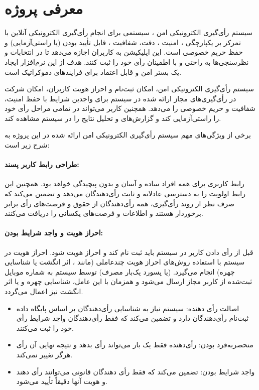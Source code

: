 \documentclass[12pt]{article}
\begin{document}
\section{معرفی پروژه} \label{sec:1}
سیستم رأی‌گیری الکترونیکی امن%
، 
سیستمی برای انجام رأی‌گیری الکترونیکی آنلاین با تمرکز بر یکپارچگی%
،
امنیت%
، 
دقت، شفافیت%
، 
قابل تأیید بودن%
(یا راستی‌آزمایی) و حفظ حریم خصوصی%
است. این اپلیکیشن به کاربران اجازه می‌دهد تا در انتخابات و نظرسنجی‌ها به راحتی و با اطمینان رأی خود را ثبت کنند. هدف از این نرم‌افزار ایجاد یک بستر امن و قابل اعتماد برای فرایندهای دموکراتیک است.


سیستم رأی‌گیری الکترونیکی امن، امکان ثبت‌نام و احراز هویت کاربران، امکان شرکت در رأی‌گیری‌های مجاز ارائه شده در سیستم برای واجدین شرایط با حفظ امنیت، شفافیت و حریم خصوصی را می‌دهد. همچنین کاربر می‌تواند در تمامی مراحل رأی خود را راستی‌آزمایی کند و گزارش‌های و تحلیل نتایج را در سیستم مشاهده کند. 


برخی از ویژگی‌های مهم سیستم رأی‌گیری الکترونیکی امن ارائه شده در این پروژه به شرح زیر است: 

\paragraph{طراحی رابط کاربر پسند:}
رابط کاربری برای همه افراد ساده و آسان و بدون پیچیدگی خواهد بود. همچنین این رابط اولویت را به دسترسی عادلانه و ثابت رأی‌دهندگان می‌دهد و تضمین می‌کند که صرف نظر از روند رأی‌گیری، همه رأی‌دهندگان از حقوق و فرصت‌های رأی برابر برخوردار هستند و اطلاعات و فرصت‌های یکسانی را دریافت می‌کنند.

\paragraph{احراز هویت و واجد شرایط بودن:}
قبل از رأی دادن کاربر در سیستم باید ثبت نام کند و احراز هویت%
شود. احراز هویت در سیستم با استفاده روش‌های احراز هویت چندعاملی%
(مانند 
، 
اثر انگشت یا شناسایی چهره) انجام می‌گیرد.   (یا پسورد یک‌بار مصرف) توسط سیستم به شماره موبایل ثبت‌شده از کاربر مجاز ارسال می‌شود و همزمان با این عامل، شناسایی چهره و یا اثر انگشت نیز اعمال می‌گردد. 
\begin{itemize}
\item
اصالت رأی دهنده: سیستم نیاز به شناسایی رأی‌دهندگان بر اساس پایگاه داده ثبت‌نام رأی‌دهندگان دارد و تضمین می‌کند که فقط رأی‌دهندگان واجد شرایط رأی خود را ثبت می‌کنند.
\item
منحصربه‌فرد بودن: رأی‌دهنده فقط یک بار می‌تواند رأی بدهد و نتیجه نهایی آن رأی هرگز تغییر نمی‌کند.
\item
واجد شرایط بودن: تضمین می‌کند که فقط رأی دهندگان قانونی می‌توانند رأی دهند و هویت آنها دقیقاً تأیید می‌شود.
\end{itemize}
\end{document}
